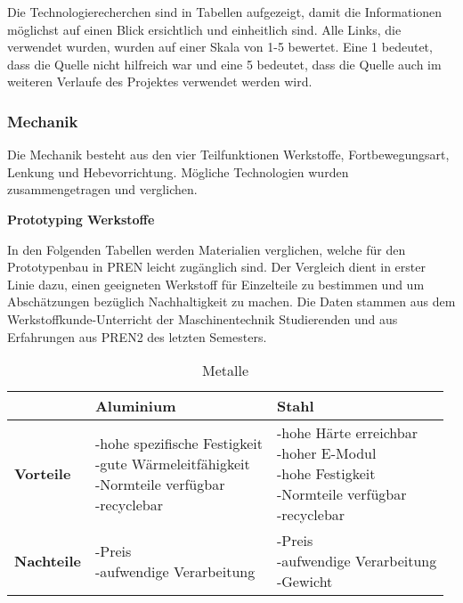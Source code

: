 Die Technologierecherchen sind in Tabellen aufgezeigt, damit die Informationen möglichst auf einen Blick ersichtlich und einheitlich sind. Alle Links, die verwendet wurden, wurden auf einer Skala von 1-5 bewertet. Eine 1 bedeutet, dass die Quelle nicht hilfreich war und eine 5 bedeutet, dass die Quelle auch im weiteren Verlaufe des Projektes verwendet werden wird.

\subsubsection{Mechanik}

Die Mechanik besteht aus den vier Teilfunktionen Werkstoffe, Fortbewegungsart, Lenkung und Hebevorrichtung. Mögliche Technologien wurden zusammengetragen und verglichen.

\textbf{Prototyping Werkstoffe}

In den Folgenden Tabellen werden Materialien verglichen, welche für den Prototypenbau in PREN leicht zugänglich sind. Der Vergleich dient in erster Linie dazu, einen geeigneten Werkstoff für Einzelteile zu bestimmen und um Abschätzungen bezüglich Nachhaltigkeit zu machen. Die Daten stammen aus dem Werkstoffkunde-Unterricht der Maschinentechnik Studierenden und aus Erfahrungen aus PREN2 des letzten Semesters.

\begin{table}[H]
\centering
\small
\begin{tabularx}{\textwidth}{|l|X|X|}
\hline
  \textbf{} & \textbf{Aluminium} & \textbf{Stahl} \\
  \hline
  \textbf{Vorteile}  & \makecell{-hohe spezifische Festigkeit\\ -gute Wärmeleitfähigkeit \\ -Normteile verfügbar \\ -recyclebar} & \makecell{-hohe Härte erreichbar \\-hoher E-Modul\\-hohe Festigkeit \\ -Normteile verfügbar\\ -recyclebar}\\ 
  \hline
  \textbf{Nachteile} & \makecell{-Preis \\ -aufwendige Verarbeitung \\} & \makecell{-Preis\\-aufwendige Verarbeitung \\ -Gewicht}\\
  \hline
\end{tabularx}
\caption{Metalle}
\label{table:metals-comparison}
\end{table}


